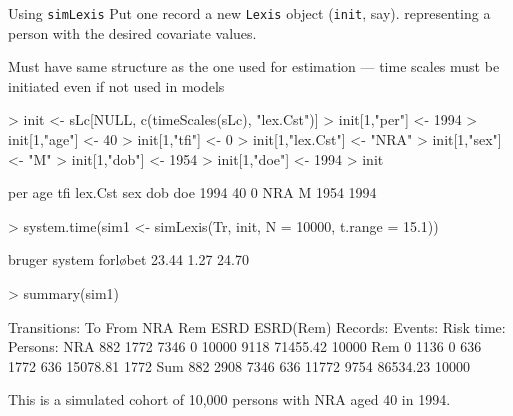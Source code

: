 \begin{frame}{Using \texttt{simLexis}}
Put one record a new \texttt{Lexis} object (\texttt{init}, say).
representing a person with the desired covariate values.

Must have same structure as the one used for estimation --- time
scales must be initiated even if not used in models\\[-1ex]
\begin{Schunk}
\begin{Sinput}
> init <- sLc[NULL, c(timeScales(sLc), "lex.Cst")]
> init[1,"per"] <- 1994
> init[1,"age"] <- 40
> init[1,"tfi"] <- 0
> init[1,"lex.Cst"] <- "NRA"
> init[1,"sex"] <- "M"
> init[1,"dob"] <- 1954
> init[1,"doe"] <- 1994
> init
\end{Sinput}
\begin{Soutput}
  per age tfi lex.Cst sex  dob  doe
 1994  40   0     NRA   M 1954 1994
\end{Soutput}
\begin{Sinput}
> system.time(sim1 <- simLexis(Tr, init, N = 10000, t.range = 15.1))
\end{Sinput}
\begin{Soutput}
  bruger   system forløbet 
   23.44     1.27    24.70 
\end{Soutput}
\begin{Sinput}
> summary(sim1)
\end{Sinput}
\begin{Soutput}
Transitions:
     To
From  NRA  Rem ESRD ESRD(Rem)  Records:  Events: Risk time:  Persons:
  NRA 882 1772 7346         0     10000     9118   71455.42     10000
  Rem   0 1136    0       636      1772      636   15078.81      1772
  Sum 882 2908 7346       636     11772     9754   86534.23     10000
\end{Soutput}
\end{Schunk}
\pause
This is a simulated cohort of 10,000 persons with NRA aged 40 in 1994.
\pause
\end{frame}

